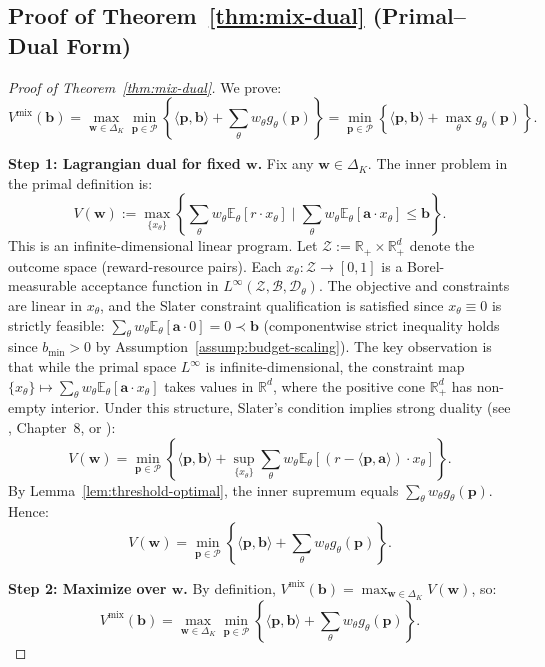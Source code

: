 \documentclass[11pt]{article}
\newcommand{\bb}{\mathbf{b}}
\newcommand{\ba}{\mathbf{a}}
\newcommand{\bp}{\mathbf{p}}
\newcommand{\bw}{\mathbf{w}}
\newcommand{\E}{\mathbb{E}}
\newcommand{\R}{\mathbb{R}}
\newcommand{\cP}{\mathcal{P}}
\begin{document}
\subsection{Proof of Theorem~\ref{thm:mix-dual} (Primal--Dual Form)}

\begin{proof}[Proof of Theorem~\ref{thm:mix-dual}]
We prove:
\[
V^{\mathrm{mix}}(\bb) = \max_{\bw \in \Delta_K} \min_{\bp \in \cP} \left\{ \langle \bp, \bb \rangle + \sum_\theta w_\theta g_\theta(\bp) \right\} = \min_{\bp \in \cP} \left\{ \langle \bp, \bb \rangle + \max_\theta g_\theta(\bp) \right\}.
\]

\textbf{Step 1: Lagrangian dual for fixed $\bw$.}
Fix any $\bw \in \Delta_K$. The inner problem in the primal definition is:
\[
V(\bw) := \max_{\{x_\theta\}} \left\{ \sum_\theta w_\theta \E_\theta[r \cdot x_\theta] \;\Big|\; \sum_\theta w_\theta \E_\theta[\ba \cdot x_\theta] \le \bb \right\}.
\]
This is an infinite-dimensional linear program. Let $\mathcal{Z} := \R_+ \times \R_+^d$ denote the outcome space (reward-resource pairs). Each $x_\theta: \mathcal{Z} \to [0,1]$ is a Borel-measurable acceptance function in $L^\infty(\mathcal{Z}, \mathcal{B}, \mathcal{D}_\theta)$. The objective and constraints are linear in $x_\theta$, and the Slater constraint qualification is satisfied since $x_\theta \equiv 0$ is strictly feasible: $\sum_\theta w_\theta \E_\theta[\ba \cdot 0] = 0 \prec \bb$ (componentwise strict inequality holds since $b_{\min} > 0$ by Assumption~\ref{assump:budget-scaling}). The key observation is that while the primal space $L^\infty$ is infinite-dimensional, the constraint map $\{x_\theta\} \mapsto \sum_\theta w_\theta \E_\theta[\ba \cdot x_\theta]$ takes values in $\R^d$, where the positive cone $\R_+^d$ has non-empty interior. Under this structure, Slater's condition implies strong duality (see \citet{luenberger1969optimization}, Chapter~8, or \citet{anderson1987linear}):
\[
V(\bw) = \min_{\bp \in \cP} \left\{ \langle \bp, \bb \rangle + \sup_{\{x_\theta\}} \sum_\theta w_\theta \E_\theta[(r - \langle \bp, \ba \rangle) \cdot x_\theta] \right\}.
\]
By Lemma~\ref{lem:threshold-optimal}, the inner supremum equals $\sum_\theta w_\theta g_\theta(\bp)$. Hence:
\[
V(\bw) = \min_{\bp \in \cP} \left\{ \langle \bp, \bb \rangle + \sum_\theta w_\theta g_\theta(\bp) \right\}.
\]

\textbf{Step 2: Maximize over $\bw$.}
By definition, $V^{\mathrm{mix}}(\bb) = \max_{\bw \in \Delta_K} V(\bw)$, so:
\[
V^{\mathrm{mix}}(\bb) = \max_{\bw \in \Delta_K} \min_{\bp \in \cP} \left\{ \langle \bp, \bb \rangle + \sum_\theta w_\theta g_\theta(\bp) \right\}.
\]


\end{proof}
\end{document}
